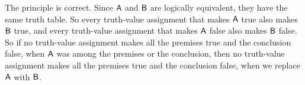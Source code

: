 \begin{earg}
\begin{ebullet}
\item[] The principle is correct. Since $\mathsf{A}$ and $\mathsf{B}$ are logically equivalent, they have the same truth table. So every truth-value assignment that makes $\mathsf{A}$ true also makes $\mathsf{B}$ true, and every truth-value assignment that makes $\mathsf{A}$ false also makes $\mathsf{B}$ false. So if no truth-value assignment makes all the premises true and the conclusion false, when $\mathsf{A}$ was among the premises or the conclusion, then no truth-value assignment makes all the premises true and the conclusion false, when we replace $\mathsf{A}$ with $\mathsf{B}$.
\end{ebullet}

\end{earg}

